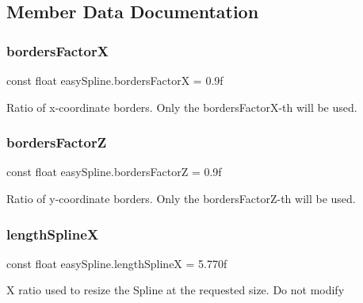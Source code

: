 \subsection{Member Data Documentation}
\mbox{\label{classeasySpline_a15f0867bca07e689105eac1b61d92155}} 
\subsubsection{\texorpdfstring{borders\+FactorX}{bordersFactorX}}
{\footnotesize\ttfamily const float easy\+Spline.\+borders\+FactorX = 0.\+9f}



Ratio of x-\/coordinate borders. Only the borders\+Factor\+X-\/th will be used.

\mbox{\label{classeasySpline_a61234928f5a518ae8bb329f981efd903}} 
\subsubsection{\texorpdfstring{borders\+FactorZ}{bordersFactorZ}}
{\footnotesize\ttfamily const float easy\+Spline.\+borders\+FactorZ = 0.\+9f}



Ratio of y-\/coordinate borders. Only the borders\+Factor\+Z-\/th will be used.

\mbox{\label{classeasySpline_aa1cda6cd9ba7feb7251b526a320f0680}} 
\subsubsection{\texorpdfstring{length\+SplineX}{lengthSplineX}}
{\footnotesize\ttfamily const float easy\+Spline.\+length\+SplineX = 5.\+770f\hspace{0.3cm}{\ttfamily [private]}}



X ratio used to resize the Spline at the requested size. Do not modify


